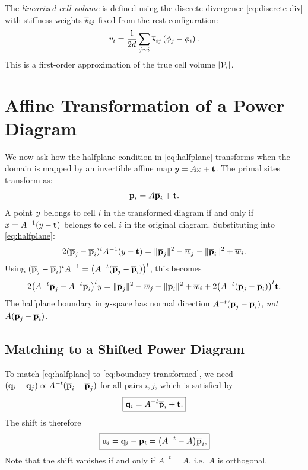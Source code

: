 \documentclass[11pt,a4paper]{article}
\begin{document}
The \emph{linearized cell volume} is defined using the discrete divergence \eqref{eq:discrete-div} with stiffness weights $\overline{\star}_{ij}$ fixed from the rest configuration:
\begin{equation}
\label{eq:lin-vol}
v_i = \frac{1}{2d} \sum_{j \sim i} \overline{\star}_{ij} \left(\phi_j - \phi_i\right).
\end{equation}
This is a first-order approximation of the true cell volume $|\mathcal{V}_i|$.


\section{Affine Transformation of a Power Diagram}\label{sec:affine}

We now ask how the halfplane condition in \eqref{eq:halfplane} transforms when the domain is mapped by an invertible affine map $y = Ax + \mathbf{t}$.
The primal sites transform as:
\begin{equation}\label{eq:primal-site}
  \mathbf{p}_i = A\overline{\mathbf{p}}_i + \mathbf{t}.
\end{equation}
A point $y$ belongs to cell $i$ in the transformed diagram if and only if
$x = A^{-1}(y - \mathbf{t})$ belongs to cell $i$ in the original diagram.
Substituting into \eqref{eq:halfplane}:
\begin{equation}
  2(\overline{\mathbf{p}}_j - \overline{\mathbf{p}}_i)^t A^{-1}(y - \mathbf{t})
  = \|\overline{\mathbf{p}}_j\|^2 - \overline{w}_j - \|\overline{\mathbf{p}}_i\|^2 + \overline{w}_i.
\end{equation}
Using $(\overline{\mathbf{p}}_j - \overline{\mathbf{p}}_i)^t A^{-1} = \bigl(A^{-t}(\overline{\mathbf{p}}_j - \overline{\mathbf{p}}_i)\bigr)^t$, this becomes
\begin{equation}\label{eq:boundary-transformed}
  2\bigl(A^{-t}\overline{\mathbf{p}}_j - A^{-t}\overline{\mathbf{p}}_i\bigr)^t y
  = \|\overline{\mathbf{p}}_j\|^2 - \overline{w}_j - \|\overline{\mathbf{p}}_i\|^2 + \overline{w}_i
    + 2\bigl(A^{-t}(\overline{\mathbf{p}}_j - \overline{\mathbf{p}}_i)\bigr)^t \mathbf{t}.
\end{equation}
The halfplane boundary in $y$-space has normal direction $A^{-t}(\overline{\mathbf{p}}_j - \overline{\mathbf{p}}_i)$, \emph{not} $A(\overline{\mathbf{p}}_j - \overline{\mathbf{p}}_i)$.

\subsection{Matching to a Shifted Power Diagram}

To match \eqref{eq:halfplane} to \eqref{eq:boundary-transformed}, we need
$(\mathbf{q}_i - \mathbf{q}_j) \propto A^{-t}(\overline{\mathbf{p}}_i - \overline{\mathbf{p}}_j)$ for all pairs $i,j$, which is satisfied by
\begin{equation}\label{eq:dual-site}
  \boxed{\mathbf{q}_i = A^{-t}\overline{\mathbf{p}}_i + \mathbf{t}.}
\end{equation}
% 
The shift is therefore
\begin{equation}\label{eq:shift}
  \boxed{\mathbf{u}_i = \mathbf{q}_i - \mathbf{p}_i = \bigl(A^{-t} - A\bigr)\overline{\mathbf{p}}_i,}
\end{equation}
Note that the shift vanishes if and only if $A^{-t} = A$, i.e.\ $A$ is orthogonal.
\end{document}
